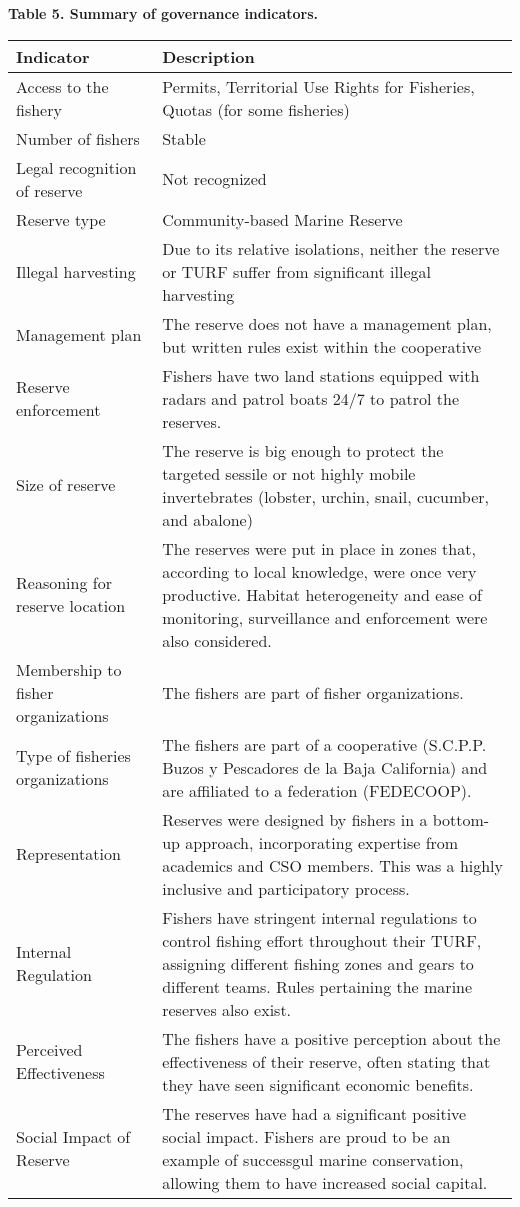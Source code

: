 \documentclass[12pt,]{article}
\begin{document}
\clearpage

\textbf{Table 5. Summary of governance indicators.}

\begin{table}[H]
\centering
\begin{tabular}{l|>{\raggedright\arraybackslash}p{9cm}}
\hline
\bfseries{Indicator} & \bfseries{Description}\\
\hline
Access to the fishery & Permits, Territorial Use Rights for Fisheries, Quotas (for some fisheries)\\
\hline
Number of fishers & Stable\\
\hline
Legal recognition of reserve & Not recognized\\
\hline
Reserve type & Community-based Marine Reserve\\
\hline
Illegal harvesting & Due to its relative isolations, neither the reserve or TURF suffer from significant illegal harvesting\\
\hline
Management plan & The reserve does not have a management plan, but written rules exist within the cooperative\\
\hline
Reserve enforcement & Fishers have two land stations equipped with radars and patrol boats 24/7 to patrol the reserves.\\
\hline
Size of reserve & The reserve is big enough to protect the targeted sessile or not highly mobile invertebrates (lobster, urchin, snail, cucumber, and abalone)\\
\hline
Reasoning for reserve location & The reserves were put in place in zones that, according to local knowledge, were once very productive. Habitat heterogeneity and ease of monitoring, surveillance and enforcement were also considered.\\
\hline
Membership to fisher organizations & The fishers are part of fisher organizations.\\
\hline
Type of fisheries organizations & The fishers are part of a cooperative (S.C.P.P. Buzos y Pescadores de la Baja California) and are affiliated to a federation (FEDECOOP).\\
\hline
Representation & Reserves were designed by fishers in a bottom-up approach, incorporating expertise from academics and CSO members. This was a highly inclusive and participatory process.\\
\hline
Internal Regulation & Fishers have stringent internal regulations to control fishing effort throughout their TURF, assigning different fishing zones and gears to different teams. Rules pertaining the marine reserves also exist.\\
\hline
Perceived Effectiveness & The fishers have a positive perception about the effectiveness of their reserve, often stating that they have seen significant economic benefits.\\
\hline
Social Impact of Reserve & The reserves have had a significant positive social impact. Fishers are proud to be an example of successgul marine conservation, allowing them to have increased social capital.\\
\hline
\end{tabular}
\end{table}
\end{document}
